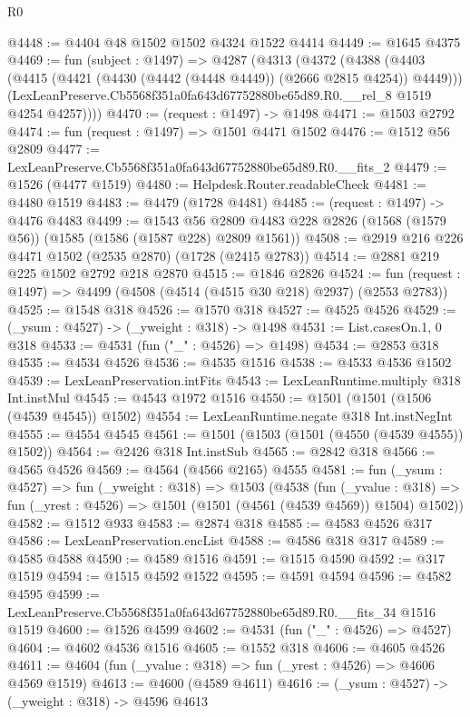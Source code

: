 \begin{lexlean}{R0}
\begin{coremodule}
@4448 := @4404 @48 @1502 @1502 @4324 @1522 @4414
@4449 := @1645 @4375
@4469 := fun (subject : @1497) =>
  @4287
    (@4313
      (@4372
        (@4388
          (@4403 (@4415 (@4421 (@4430 (@4442 (@4448 @4449)) (@2666 @2815 @4254)) @4449)))
          (LexLeanPreserve.Cb5568f351a0fa643d67752880be65d89.R0.__rel_8 @1519 @4254 @4257))))
@4470 := (request : @1497) -> @1498
@4471 := @1503 @2792
@4474 := fun (request : @1497) => @1501 @4471 @1502
@4476 := @1512 @56 @2809
@4477 := LexLeanPreserve.Cb5568f351a0fa643d67752880be65d89.R0.__fits_2
@4479 := @1526 (@4477 @1519)
@4480 := Helpdesk.Router.readableCheck
@4481 := @4480 @1519
@4483 := @4479 (@1728 @4481)
@4485 := (request : @1497) -> @4476 @4483
@4499 := @1543
    @56
    @2809
    @4483
    @228
    @2826
    (@1568 (@1579 @56))
    (@1585 (@1586 (@1587 @228) @2809 @1561))
@4508 := @2919 @216 @226 @4471 @1502 (@2535 @2870) (@1728 (@2415 @2783))
@4514 := @2881 @219 @225 @1502 @2792 @218 @2870
@4515 := @1846 @2826
@4524 := fun (request : @1497) => @4499 (@4508 (@4514 (@4515 @30 @218) @2937) (@2553 @2783))
@4525 := @1548 @318
@4526 := @1570 @318
@4527 := @4525 @4526
@4529 := (_ysum : @4527) -> (_yweight : @318) -> @1498
@4531 := List.casesOn.{1, 0} @318
@4533 := @4531 (fun ("_" : @4526) => @1498)
@4534 := @2853 @318
@4535 := @4534 @4526
@4536 := @4535 @1516
@4538 := @4533 @4536 @1502
@4539 := LexLeanPreservation.intFits
@4543 := LexLeanRuntime.multiply @318 Int.instMul
@4545 := @4543 @1972 @1516
@4550 := @1501 (@1501 (@1506 (@4539 @4545)) @1502)
@4554 := LexLeanRuntime.negate @318 Int.instNegInt
@4555 := @4554 @4545
@4561 := @1501 (@1503 (@1501 (@4550 (@4539 @4555)) @1502))
@4564 := @2426 @318 Int.instSub
@4565 := @2842 @318
@4566 := @4565 @4526
@4569 := @4564 (@4566 @2165) @4555
@4581 := fun (_ysum : @4527) =>
  fun (_yweight : @318) =>
  @1503
    (@4538
      (fun (_yvalue : @318) =>
      fun (_yrest : @4526) => @1501 (@1501 (@4561 (@4539 @4569)) @1504) @1502))
@4582 := @1512 @933
@4583 := @2874 @318
@4585 := @4583 @4526 @317
@4586 := LexLeanPreservation.encList
@4588 := @4586 @318 @317
@4589 := @4585 @4588
@4590 := @4589 @1516
@4591 := @1515 @4590
@4592 := @317 @1519
@4594 := @1515 @4592 @1522
@4595 := @4591 @4594
@4596 := @4582 @4595
@4599 := LexLeanPreserve.Cb5568f351a0fa643d67752880be65d89.R0.__fits_34 @1516 @1519
@4600 := @1526 @4599
@4602 := @4531 (fun ("_" : @4526) => @4527)
@4604 := @4602 @4536 @1516
@4605 := @1552 @318
@4606 := @4605 @4526
@4611 := @4604 (fun (_yvalue : @318) => fun (_yrest : @4526) => @4606 @4569 @1519)
@4613 := @4600 (@4589 @4611)
@4616 := (_ysum : @4527) -> (_yweight : @318) -> @4596 @4613

\end{coremodule}
\end{lexlean}
